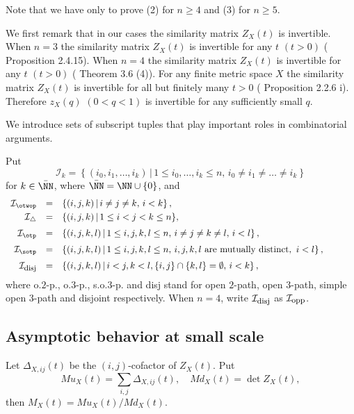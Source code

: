 Note that we have only to prove (2) for $n\ge4$ and (3) for $n\ge5$. 

We first remark that in our cases the similarity matrix $Z_X(t)$ is invertible. 
When $n=3$ the similarity matrix $Z_X(t)$ is invertible for any $t$ $(t>0)$ (\cite{L13} Proposition 2.4.15).
When $n=4$ the similarity matrix $Z_X(t)$ is invertible for any $t$ $(t>0)$ (\cite{M13} Theorem 3.6 (4)). 
For any finite metric space $X$ the similarity matrix $Z_X(t)$ is invertible for all but finitely many $t>0$ (\cite{L13} Proposition 2.2.6 i). 
Therefore %
$z_X(q)$ $(0<q<1)$ is invertible for any sufficiently small $q$. 


\bigskip
We introduce sets of subscript tuples that play important roles in combinatorial arguments. 
%
\begin{definition}\label{def_I} \rm 
Put 
\[
\mathcal{I}_{k}%
=\displaystyle \left\{(i_0,i_1,\dots,i_k)\,|\,1\le i_0,\dots,i_k \le n, \, 
i_0\ne i_1\ne \dots \ne i_k \right\}  %
\]
for $k\in\bar\NN$, where $\bar\NN=\NN\cup\{0\}$, and 
\begin{equation}\label{eq_def_I}%
\begin{array}{rcl}
\mathcal{I}_\otwop&=&\displaystyle \left\{(i,j,k)\,|\,i\ne j\ne k, \,i<k\right\}, \\[1mm]
%
%

\mathcal{I}_\triangle&=&\{(i,j,k)\,|\,1\le i<j<k\le n\}, \\[2mm]
%
\mathcal{I}_\otp&=& \displaystyle \left\{(i,j,k,l)\,|\,1\le i,j,k,l \le n, \, 
i\ne j\ne k\ne l, \, i<l\right\}, \hspace{1cm}{}  \\[2mm]
%
\mathcal{I}_\sotp&=& \displaystyle \left\{(i,j,k,l)\,|\,1\le i,j,k,l \le n, \, 
i,j,k,l \mbox{ are mutually distinct, } \, i<l\right\}, \hspace{1cm}{}  \\[2mm]
%
\mathcal{I}_{\mbox{\rm \footnotesize disj}}&=&\displaystyle \left\{(i,j,k,l)\,|\,i<j,k<l,\{i,j\}\cap\{k,l\}=\emptyset, \, i<k \right\}, %
%
%
\end{array}
\notag
\end{equation}
where o.$2$-p., o.$3$-p., s.o.$3$-p. and disj stand for open $2$-path, open $3$-path, simple open $3$-path and disjoint respectively. 
When $n=4$, write $\mathcal{I}_{\mbox{\rm \footnotesize disj}}$ as $\mathcal{I}_{\mbox{\rm \footnotesize opp}}$. 
\end{definition}


%
\subsection{Asymptotic behavior at small scale}\label{small-scale_asympt} 
%
Let $\Delta_{X,ij}(t)$ be the $(i,j)$-cofactor of $Z_X(t)$. 
Put 
\[
M\!u_X(t)=\sum_{i,j}\Delta_{X,ij}(t), \quad M\!d_X(t)=\det Z_X(t), 
\] 
then $M_X(t)=M\!u_X(t)/M\!d_X(t)$. 


